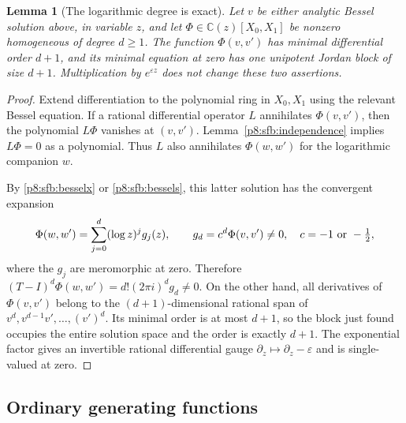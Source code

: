 \documentclass[11pt,a4paper]{article}
\newtheorem{lemma}[theorem]{Lemma}
\theoremstyle{definition}
\theoremstyle{remark}
\numberwithin{equation}{section}
\begin{document}
\begin{lemma}[The logarithmic degree is exact]\label{p8:sfb:logblock}
Let $v$ be either analytic Bessel solution above, in variable $z$,
and let $\Phi\in\mathbb C(z)[X_0,X_1]$ be nonzero homogeneous
of degree $d\ge1$.  The function $\Phi(v,v')$ has minimal
differential order $d+1$, and its minimal equation at zero has
one unipotent Jordan block of size $d+1$.
Multiplication by $e^{\varepsilon z}$ does not change these
two assertions.
\end{lemma}
\begin{proof}
Extend differentiation to the polynomial ring in $X_0,X_1$
using the relevant Bessel equation.  If a rational differential
operator $L$ annihilates $\Phi(v,v')$, then the polynomial
$L\Phi$ vanishes at $(v,v')$.  Lemma~\ref{p8:sfb:independence}
implies $L\Phi=0$ as a polynomial.  Thus $L$ also annihilates
$\Phi(w,w')$ for the logarithmic companion $w$.

By \eqref{p8:sfb:besselx} or \eqref{p8:sfb:bessels}, this latter
solution has the convergent expansion
\[
 \Phi(w,w')=\sum_{j=0}^{d}(\log z)^j g_j(z),\qquad
 g_d=c^d\Phi(v,v')\ne0,
 \quad c=-1\ \hbox{or}\ -\tfrac12,
\]
where the $g_j$ are meromorphic at zero.  Therefore
$(T-I)^d\Phi(w,w')=d!(2\pi i)^dg_d\ne0$.
On the other hand, all derivatives of $\Phi(v,v')$ belong
to the $(d+1)$-dimensional rational span of
$v^d,v^{d-1}v',\ldots,(v')^d$.  Its minimal order is at
most $d+1$, so the block just found occupies the entire
solution space and the order is exactly $d+1$.
The exponential factor gives an invertible rational differential
gauge $\partial_z\mapsto\partial_z-\varepsilon$ and is
single-valued at zero.
\end{proof}

\subsection{Ordinary generating functions}
\end{document}
